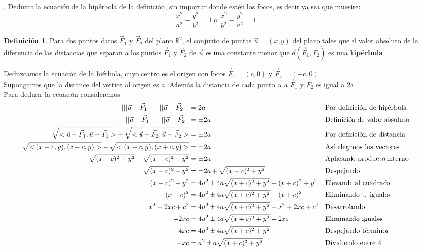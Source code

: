 \documentclass[letterpaper]{article}
\newcommand{\R}{\mathds{R}}
\renewcommand{\*}{\cdot}
\DeclarePairedDelimiter\abs{\lvert}{\rvert}%
\theoremstyle{definition}
\newtheorem{definition}{Definición}
\begin{document}
	\newpage
	. Deduzca la ecuación de la hipérbola de la definición, sin importar donde estén los focos, es decir ya sea que muestre: $$\dfrac{x^2}{a^2} -  \dfrac{y^2}{b^2} = 1 \text{ o }  \dfrac{x^2}{b^2} - \dfrac{y^2}{a^2}=1$$
	\begin{definition}
		Para dos puntos datos $ \vec{F}_1 $ y $ \vec{F}_2 $ del plano $ \R^2 $, el conjunto de puntos $ \vec{u} = (x,y) $ del plano tales que el valor absoluto de la diferencia de las distancias que separan a los puntos $ \vec{F}_1 $ y $ \vec{F}_2 $ de $ \vec{u} $ es una constante menor que $ d(\vec{F}_1,\vec{F}_2) $ es una \textbf{hipérbola}
	\end{definition}
	Deduzcamos la ecuación de la hiérbola, cuyo centro es el origen con focos $ \vec{F}_1 = (c,0) $ y $ \vec{F}_2 = (-c,0) $\\ Supongamos que la distance del vértice al origen es $ a $. Además la distancia de cada punto $ \vec{u} $ a $ \vec{F}_1 $ y $ \vec{F}_2 $ es igual a $ 2a $\\Para deducir la ecuación consideremos
	\begin{align*}
	\abs{||\vec{u} - \vec{F}_1|| - || \vec{u} - \vec{F}_2||} &= 2a && \text{Por definición de hipérbola}\\ 
	||\vec{u} - \vec{F}_1|| - || \vec{u} - \vec{F}_2|| &= \pm 2a && \text{Definición de valor absoluto}\\ 
	\sqrt{ <\vec{u} - \vec{F}_1, \vec{u} - \vec{F}_1> }  - \sqrt{< \vec{u} - \vec{F}_2, \vec{u} - \vec{F}_2 >} &= \pm 2a && \text{Por definición de distancia}\\ 
	\sqrt{ <(x-c,y), (x-c,y)> }  - \sqrt{< (x+c,y),(x+c,y) >} &= \pm 2a && \text{Así elegimos los vectores}\\ 
	\sqrt{ (x-c)^2 +y^2 }  - \sqrt{ (x+c)^2 + y^2} &= \pm 2a && \text{Aplicando producto interno}\\ 
	\sqrt{ (x-c)^2 + y^2 }  &= \pm 2a + \sqrt{ (x+c)^2 + y^2} && \text{Despejando}\\
	(x-c)^2 + y^2 &= 4a^2 \pm 4a\sqrt{ (x+c)^2 + y^2} + (x+c)^2 + y^2 && \text{Elevando al cuadrado}\\ 
	(x-c)^2  &= 4a^2 \pm 4a\sqrt{ (x+c)^2 + y^2} + (x+c)^2 && \text{Eliminando t. iguales}\\ 
	x^2 -2xc +c^2  &= 4a^2 \pm 4a\sqrt{ (x+c)^2 + y^2} + x^2+2xc+c^2 && \text{Desarrolando}\\ 
	-2xc &= 4a^2 \pm 4a\sqrt{ (x+c)^2 + y^2} +2xc && \text{Eliminando iguales}\\ 
	-4xc &= 4a^2 \pm 4a\sqrt{ (x+c)^2 + y^2} && \text{Despejando términos}\\ 
	-xc &= a^2 \pm a\sqrt{ (x+c)^2 + y^2} && \text{Dividiendo entre 4}\\ 
	\end{align*}
\end{document}
